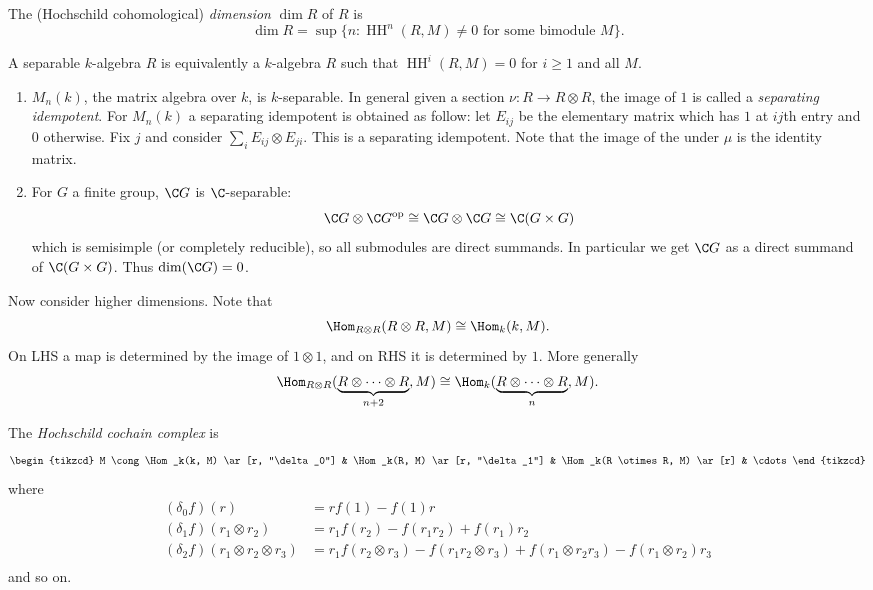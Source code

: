 \documentclass[a4paper]{article}
\DeclareMathOperator{\HH}{HH}
\begin{document}
\begin{definition}
  The (Hochschild cohomological) \emph{dimension} \(\dim R\) of \(R\) is
  \[
    \dim R = \sup \{n: \HH^n(R, M) \neq 0 \text{ for some bimodule } M\}.
  \]
\end{definition}

\begin{remark}
  A separable \(k\)-algebra \(R\) is equivalently a \(k\)-algebra \(R\) such that  \(\HH^i(R, M) = 0\) for \(i \geq 1\) and all \(M\).
\end{remark}

\begin{eg}\leavevmode
  \begin{enumerate}
  \item \(M_n(k)\), the matrix algebra over \(k\), is \(k\)-separable. In general given a section \(\nu: R \to R \otimes R\), the image of \(1\) is called a \emph{separating idempotent}. For \(M_n(k)\) a separating idempotent is obtained as follow: let \(E_{ij}\) be the elementary matrix which has \(1\) at \(ij\)th entry and \(0\) otherwise. Fix \(j\) and consider \(\sum_i E_{ij} \otimes E_{ji}\). This is a separating idempotent. Note that the image of the under \(\mu\) is the identity matrix.
  \item For \(G\) a finite group, \(\C G\) is \(\C\)-separable:
    \[
      \C G \otimes \C G^{\text{op}}
      \cong \C G \otimes \C G
      \cong \C( G \times G)
    \]
    which is semisimple (or completely reducible), so all submodules are direct summands. In particular we get \(\C G\) as a direct summand of \(\C(G \times G)\). Thus \(\dim (\C G) = 0\).
  \end{enumerate}
\end{eg}

Now consider higher dimensions. Note that
\[
  \Hom_{R \otimes R} (R \otimes R, M) \cong \Hom_k (k, M).
\]
On LHS a map is determined by the image of \(1 \otimes 1\), and on RHS it is determined by \(1\). More generally
\[
  \Hom_{R \otimes R} (\underbrace{R \otimes \dots \otimes R}_{n + 2}, M) \cong \Hom_k (\underbrace{R \otimes \dots \otimes R}_n, M).
\]
 
\begin{definition}
  The \emph{Hochschild cochain complex} is
  \[
    \begin{tikzcd}
      M \cong \Hom_k(k, M) \ar[r, "\delta_0"] & \Hom_k(R, M) \ar[r, "\delta_1"] & \Hom_k(R \otimes R, M) \ar[r] & \cdots
    \end{tikzcd}
  \]
  where
  \begin{align*}
    (\delta_0 f)(r) &= rf(1) - f(1) r \\
    (\delta_1 f)(r_1 \otimes r_2) &= r_1 f(r_2) - f(r_1r_2) + f(r_1)r_2 \\
    (\delta_2 f)(r_1 \otimes r_2 \otimes r_3) &= r_1 f(r_2 \otimes r_3) - f(r_1r_2 \otimes r_3) + f(r_1 \otimes r_2r_3) - f(r_1 \otimes r_2) r_3 \\
  \end{align*}
  and so on.
\end{definition}
\end{document}
